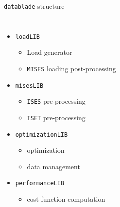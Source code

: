 \begin{frame}{\texttt{datablade} structure}
\begin{columns}
\begin{itemize}
\begin{itemize}
                        \item Camberline setup
                        \item Blade setup
                    \end{itemize}
                \item \texttt{loadLIB}
                    \begin{itemize}
                        \item Load generator
                        \item \texttt{MISES} loading post-processing
                    \end{itemize}
                \item \texttt{misesLIB}
                    \begin{itemize}
                        \item \texttt{ISES} pre-processing
                        \item \texttt{ISET} pre-processing
                    \end{itemize}
                \item \texttt{optimizationLIB}
                    \begin{itemize}
                        \item optimization 
                        \item data management
                    \end{itemize}
                \item \texttt{performanceLIB}
                    \begin{itemize}
                        \item cost function computation
                    \end{itemize}
            \end{itemize}
    \end{columns}
\end{frame} 

